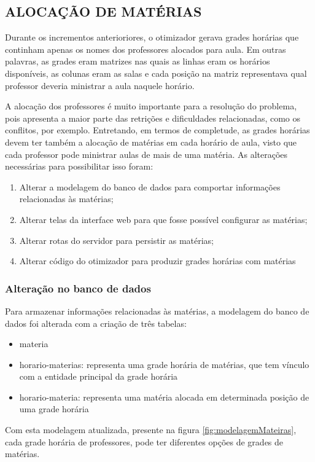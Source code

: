 \subsection{ALOCAÇÃO DE MATÉRIAS}

Durante os incrementos anterioriores, o otimizador gerava grades horárias que continham apenas os nomes dos professores alocados para aula. Em outras palavras, as grades eram matrizes nas quais as linhas eram os horários disponíveis, as colunas eram as salas e cada posição na matriz representava qual professor deveria ministrar a aula naquele horário.

A alocação dos professores é muito importante para a resolução do problema, pois apresenta a maior parte das retrições e dificuldades relacionadas, como os conflitos, por exemplo. Entretando, em termos de completude, as grades horárias devem ter também a alocação de matérias em cada horário de aula, visto que cada professor pode ministrar aulas de mais de uma matéria. As alterações necessárias para possibilitar isso foram:

\begin{enumerate}
	\item Alterar a modelagem do banco de dados para comportar informações relacionadas às matérias;
	\item Alterar telas da interface web para que fosse possível configurar as matérias;
	\item Alterar rotas do servidor para persistir as matérias;
	\item Alterar código do otimizador para produzir grades horárias com matérias
\end{enumerate}

\subsubsection{Alteração no banco de dados}
Para armazenar informações relacionadas às matérias, a modelagem do banco de dados foi alterada com a criação de três tabelas: 
\begin{itemize}
	\item materia
	\item horario-materias: representa uma grade horária de matérias, que tem vínculo com a entidade principal da grade horária
	\item horario-materia: representa uma matéria alocada em determinada posição de uma grade horária
\end{itemize}

Com esta modelagem atualizada, presente na figura \ref{fig:modelagemMateiras}, cada grade horária de professores, pode ter diferentes opções de grades de matérias.

